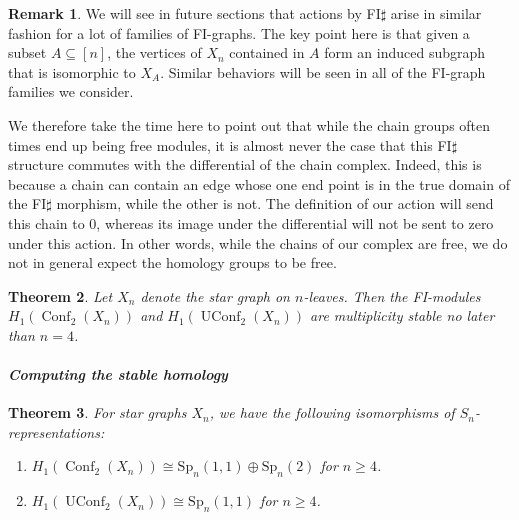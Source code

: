 \documentclass[12pt]{amsart}
\newtheorem{thm}{Theorem}[section]
\theoremstyle{definition}
\newtheorem{rmk}[thm]{Remark}
\newcommand{\conf}{\operatorname{Conf}}
\newcommand{\uconf}{\operatorname{UConf}}
\begin{document}
\begin{rmk}
    We will see in future sections that actions by FI$\sharp$ arise in similar fashion for a lot of families of FI-graphs. The key point here is that given a subset $A \subseteq [n]$, the vertices of $X_n$ contained in $A$ form an induced subgraph that is isomorphic to $X_{A}$. Similar behaviors will be seen in all of the FI-graph families we consider.
    
    We therefore take the time here to point out that while the chain groups often times end up being free modules, it is almost never the case that this FI$\sharp$ structure commutes with the differential of the chain complex. Indeed, this is because a chain can contain an edge whose one end point is in the true domain of the FI$\sharp$ morphism, while the other is not. The definition of our action will send this chain to 0, whereas its image under the differential will not be sent to zero under this action. In other words, while the chains of our complex are free, we do not in general expect the homology groups to be free.
\end{rmk}

\begin{thm} \label{starBound}
Let $X_n$ denote the star graph on $n$-leaves. Then the FI-modules $H_1(\conf_2(X_n))$ and $H_1(\uconf_2(X_n))$ are multiplicity stable no later than $n = 4$.
\end{thm}

\paragraph{\textit{Computing the stable homology}}

\begin{thm}\label{thm: star}
For star graphs $X_n$, we have the following isomorphisms of $S_n$-representations:
\begin{enumerate}
    \item $H_1(\conf_2(X_n)) \cong \mathrm{Sp}_n(1,1) \oplus \mathrm{Sp}_n(2)$ for $n\geq 4$.
    \item $H_1(\uconf_2(X_n)) \cong \mathrm{Sp}_n(1,1)$ for $n\geq 4$.
\end{enumerate}
\end{thm}
\end{document}
